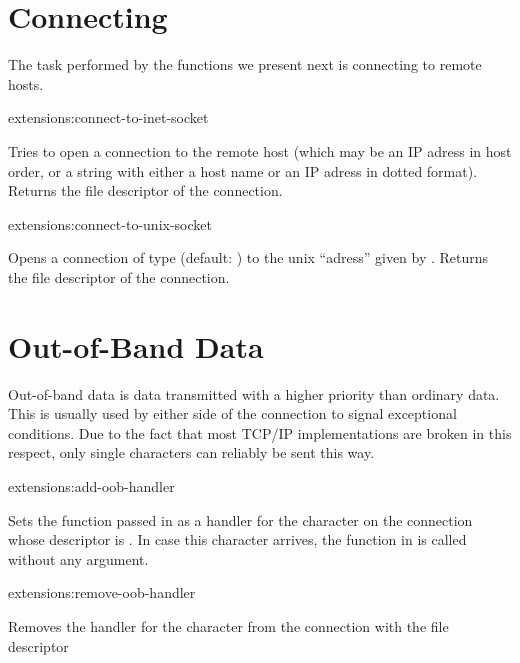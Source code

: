 \section{Connecting}

The task performed by the functions we present next is connecting to
remote hosts.

\begin{defun}{extensions:}{connect-to-inet-socket}{%
    }

  Tries to open a connection to the remote host  (which may
  be an IP adress in host order, or a string with either a host name
  or an IP adress in dotted format). Returns the file descriptor of
  the connection.

\end{defun}

\begin{defun}{extensions:}{connect-to-unix-socket}{%
    }
  
  Opens a connection of type  (default: ) to the
  unix ``adress'' given by . Returns the file descriptor of
  the connection.

\end{defun}

\section{Out-of-Band Data}
\label{internet-oob}

Out-of-band data is data transmitted with a higher priority than
ordinary data. This is usually used by either side of the connection
to signal exceptional conditions. Due to the fact that most TCP/IP
implementations are broken in this respect, only single characters can
reliably be sent this way.

\begin{defun}{extensions:}{add-oob-handler}{%
    }
  
  Sets the function passed in  as a handler for the
  character  on the connection whose descriptor is .
  In case this character arrives, the function in  is
  called without any argument.

\end{defun}

\begin{defun}{extensions:}{remove-oob-handler}{%
    }
  
  Removes the handler for the character  from the connection
  with the file descriptor 

\end{defun}


